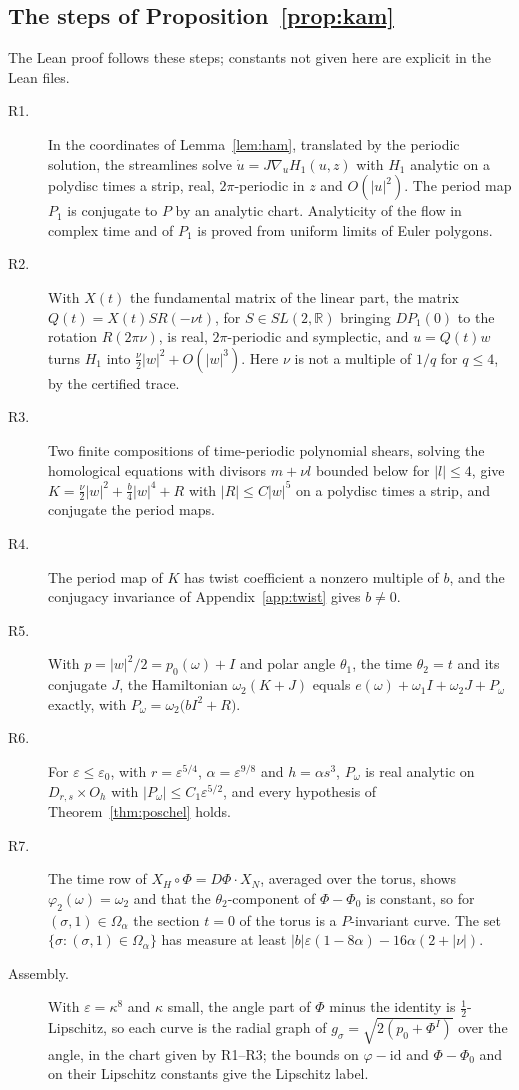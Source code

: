 \documentclass[11pt]{article}
\theoremstyle{definition}
\theoremstyle{remark}
\newcommand{\R}{\mathbb{R}}
\begin{document}
\begin{appendices}
\section{The steps of Proposition~\ref{prop:kam}}\label{app:kam}
The Lean proof follows these steps; constants not given here are explicit in
the Lean files.
\begin{description}
\item[R1.] In the coordinates of Lemma~\ref{lem:ham}, translated by the
periodic solution, the streamlines solve $\dot u=J\nabla_uH_1(u,z)$ with
$H_1$ analytic on a polydisc times a strip, real, $2\pi$-periodic in $z$ and
$O(|u|^2)$. The period map $P_1$ is conjugate to $P$ by an analytic chart.
Analyticity of the flow in complex time and of $P_1$ is proved from
uniform limits of Euler polygons.
\item[R2.] With $X(t)$ the fundamental matrix of the linear part, the matrix
$Q(t)=X(t)SR(-\nu t)$, for $S\in SL(2,\R)$ bringing $DP_1(0)$ to the rotation
$R(2\pi\nu)$, is real, $2\pi$-periodic and symplectic, and $u=Q(t)w$ turns
$H_1$ into $\tfrac\nu2|w|^2+O(|w|^3)$. Here $\nu$ is not a multiple of $1/q$
for $q\le4$, by the certified trace.
\item[R3.] Two finite compositions of time-periodic polynomial shears, solving the homological
equations with divisors $m+\nu l$ bounded below for $|l|\le4$, give
$K=\tfrac\nu2|w|^2+\tfrac b4|w|^4+R$ with $|R|\le C|w|^5$ on a polydisc times
a strip, and conjugate the period maps.
\item[R4.] The period map of $K$ has twist coefficient a nonzero multiple of
$b$, and the conjugacy invariance of Appendix~\ref{app:twist} gives $b\ne0$.
\item[R5.] With $p=|w|^2/2=p_0(\omega)+I$ and polar angle $\theta_1$, the time
$\theta_2=t$ and its conjugate $J$, the Hamiltonian $\omega_2(K+J)$ equals
$e(\omega)+\omega_1I+\omega_2J+P_\omega$ exactly, with
$P_\omega=\omega_2\bigl(bI^2+R\bigr)$.
\item[R6.] For $\varepsilon\le\varepsilon_0$, with $r=\varepsilon^{5/4}$,
$\alpha=\varepsilon^{9/8}$ and $h=\alpha s^3$, $P_\omega$ is real analytic on
$D_{r,s}\times O_h$ with $|P_\omega|\le C_1\varepsilon^{5/2}$, and every
hypothesis of Theorem~\ref{thm:poschel} holds.
\item[R7.] The time row of $X_H\circ\Phi=D\Phi\cdot X_N$, averaged over the
torus, shows $\varphi_2(\omega)=\omega_2$ and that the $\theta_2$-component
of $\Phi-\Phi_0$ is constant, so for $(\sigma,1)\in\Omega_\alpha$ the section
$t=0$ of the torus is a $P$-invariant curve. The set
$\{\sigma:(\sigma,1)\in\Omega_\alpha\}$ has measure at least
$|b|\varepsilon(1-8\alpha)-16\alpha(2+|\nu|)$.
\item[Assembly.] With $\varepsilon=\kappa^8$ and $\kappa$ small, the angle
part of $\Phi$ minus the identity is $\tfrac12$-Lipschitz, so each curve is
the radial graph of $g_\sigma=\sqrt{2(p_0+\Phi^I)}$ over the angle, in the
chart given by R1--R3; the bounds on $\varphi-\mathrm{id}$ and
$\Phi-\Phi_0$ and on their Lipschitz constants give the Lipschitz label.
\end{description}


\end{appendices}
\end{document}
